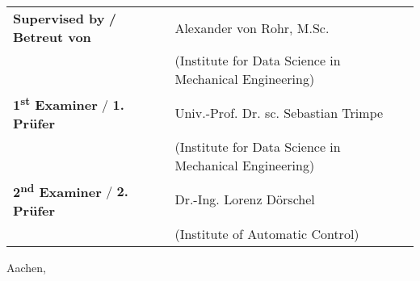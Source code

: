 \begin{titlepage}
    \begin{flushleft}
    \hspace*{-0.2cm}\begin{tabular}{ll}
        \textbf{Supervised by} \textcolor{black!60}{\textbf{/ Betreut von}} & Alexander von Rohr, M.Sc. \\
        &  (Institute for Data Science in Mechanical Engineering) \vspace{0.8cm}\\
        \textbf{1\textsuperscript{st} Examiner} \textcolor{black!60}{/ \textbf{1. Prüfer}} & Univ.-Prof. Dr. sc. Sebastian Trimpe \\
        & (Institute for Data Science in Mechanical Engineering) \vspace{0.3cm}\\
        \textbf{2\textsuperscript{nd} Examiner} \textcolor{black!60}{/ \textbf{2. Prüfer}} & Dr.-Ing. Lorenz Dörschel \\
        & (Institute of Automatic Control)
    \end{tabular}
    \end{flushleft}
    
    \vfill
    \hfill Aachen, \submitdate

    \restoregeometry
\end{titlepage}

